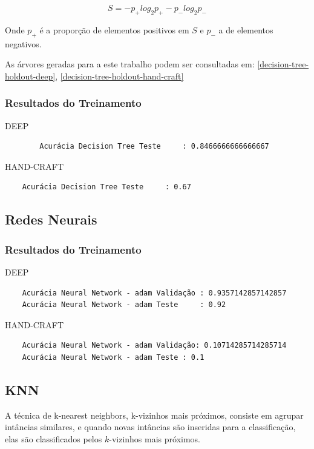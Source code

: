 \documentclass[
article,			%
11pt,				%
oneside,			%
a4paper,			%
english,			%
brazil,				%
sumario=tradicional,
]{abntex2}
\begin{document}
	\begin{equation}
	S = -p_+ log_2 p_+-p_-log_2p_-
	\end{equation}
	
	Onde \(p_+\) é a proporção de elementos positivos em \(S\) e \(p_-\) a de elementos negativos.
	
	 As árvores geradas para a este trabalho podem ser consultadas em: \autoref{decision-tree-holdout-deep}, \autoref{decision-tree-holdout-hand-craft}
	
	\subsubsection{Resultados do Treinamento}
	DEEP
	\begin{verbatim}
		Acurácia Decision Tree Teste     : 0.8466666666666667
	\end{verbatim}
	
	HAND-CRAFT
	\begin{verbatim}
	Acurácia Decision Tree Teste     : 0.67
	\end{verbatim}
	
	\subsection{Redes Neurais}
	
	\subsubsection{Resultados do Treinamento}
	DEEP
	\begin{verbatim}
	Acurácia Neural Network - adam Validação : 0.9357142857142857
	Acurácia Neural Network - adam Teste     : 0.92
	\end{verbatim}
	
	HAND-CRAFT
	\begin{verbatim}
	Acurácia Neural Network - adam Validação: 0.10714285714285714
	Acurácia Neural Network - adam Teste : 0.1
	\end{verbatim}
	
	\subsection{KNN}
	
	A técnica de k-nearest neighbors, k-vizinhos mais próximos, consiste em agrupar intâncias similares, e quando novas intâncias são inseridas para a classificação, elas são classificados pelos \(k\)-vizinhos mais próximos.
	
\end{document}
